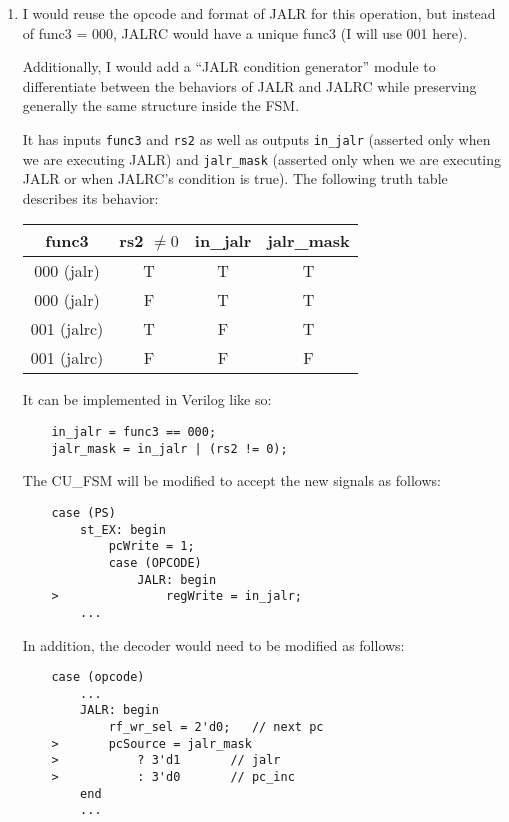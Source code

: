 \documentclass{article}
\begin{document}
\begin{enumerate}[label={\alph*.}]

    \item I would reuse the opcode and format of JALR for this operation, but instead of func3 = 000, JALRC would have a unique func3 (I will use 001 here).
    
    Additionally, I would add a ``JALR condition generator'' module to differentiate between the behaviors of JALR and JALRC while preserving generally the same structure inside the FSM. 
    
    It has inputs \texttt{func3} and \texttt{rs2} as well as outputs \texttt{in\_jalr} (asserted only when we are executing JALR) and \texttt{jalr\_mask} (asserted only when we are executing JALR or when JALRC's condition is true). The following truth table describes its behavior:
    \begin{table}[ht]
        \centering
        \begin{tabular}{c | c || c | c}
            func3 & rs2 $\neq 0$ & in\_jalr & jalr\_mask \\ 
            \hline
            000 (jalr)  & T & T & T \\
            000 (jalr)  & F & T & T \\
            001 (jalrc) & T & F & T \\
            001 (jalrc) & F & F & F \\
        \end{tabular}
    \end{table}

    It can be implemented in Verilog like so:
    \begin{verbatim}
    in_jalr = func3 == 000;
    jalr_mask = in_jalr | (rs2 != 0);
    \end{verbatim}

    The CU\_FSM will be modified to accept the new signals as follows:
    \begin{verbatim}
    case (PS)
        st_EX: begin
            pcWrite = 1;
            case (OPCODE)
                JALR: begin
    >               regWrite = in_jalr; 
        ...
    \end{verbatim}

    In addition, the decoder would need to be modified as follows:
    \begin{verbatim}
    case (opcode) 
        ...
        JALR: begin 
            rf_wr_sel = 2'd0;   // next pc
    >       pcSource = jalr_mask
    >           ? 3'd1       // jalr
    >           : 3'd0       // pc_inc
        end 
        ...
    \end{verbatim}


\end{enumerate}
\end{document}
